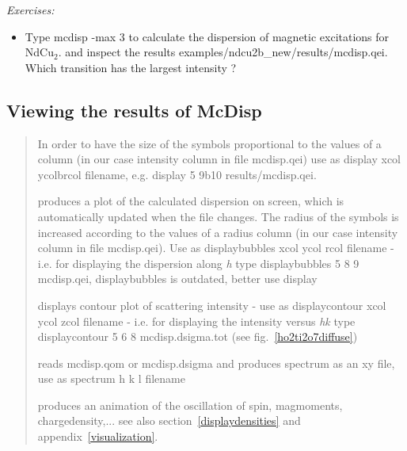 \vspace{1cm}
{\em Exercises:}
\begin{itemize}
\item Type {\prg mcdisp -max 3} to
calculate the dispersion of magnetic excitations for NdCu$_2$.
and inspect the results
{\prg examples/ndcu2b\_new/results/mcdisp.qei}.
Which  transition has the largest intensity ?
\end{itemize}

\subsection{Viewing the results of McDisp}

\begin{quote}
\item[\prg display\index{display}] In order to have the size of the symbols proportional to
		       the values of a  column (in our case intensity column in file
		       mcdisp.qei) use as {\prg display 
		       xcol ycolbrcol filename}, e.g. {\prg display 
		       5 9b10 results/mcdisp.qei}.
\item [\prg displaybubbles\index{displaybubbles}(outdated) ] produces a plot of the calculated dispersion on screen, which is 
                       automatically updated when the file changes. The radius of the symbols is increased according to
		       the values of a radius column (in our case intensity column in file
		       mcdisp.qei). Use as {\prg displaybubbles 
		       xcol ycol rcol filename} - i.e. for displaying the dispersion along
		       {\em h} type {\prg displaybubbles  5 8 9 mcdisp.qei},
                       {\prg displaybubbles} is outdated, better use {\prg display}
\item [\prg displaycontour\index{displaycontour}] displays contour plot of scattering intensity - use as
                       {\prg displaycontour xcol ycol zcol filename} - i.e. for displaying
		       the intensity versus {\em hk} type {\prg displaycontour 5 6 8 mcdisp.dsigma.tot}
		       (see fig.~\ref{ho2ti2o7diffuse})
\item [\prg spectrum]  reads mcdisp.qom or mcdisp.dsigma and produces spectrum
                       as an xy file, use as {\prg spectrum h k l filename}
\item [\prg display\_densities\index{display\_densities}] produces an animation of the 
                       oscillation of spin, magmoments, chargedensity,... see also
                       section~\ref{displaydensities} and appendix~\ref{visualization}.
\end{quote}






